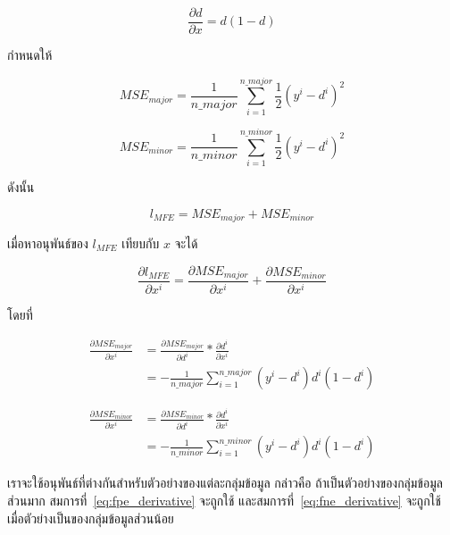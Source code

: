 \begin{equation}
\frac{\partial d}{\partial x} = d(1 - d)
\end{equation}

กำหนดให้

\begin{equation}
MSE_{major} = \frac{1}{n\_major}\sum_{i=1}^{n\_major}\frac{1}{2}(y^{i} - d^{i})^{2}
\end{equation}

\begin{equation}
MSE_{minor} = \frac{1}{n\_minor}\sum_{i=1}^{n\_minor}\frac{1}{2}(y^{i} - d^{i})^{2}
\end{equation}

ดังนั้น

\begin{equation}
    l_{MFE} = MSE_{major} + MSE_{minor}
\end{equation}

เมื่อหาอนุพันธ์ของ $l_{MFE}$ เทียบกับ $x$ จะได้

\begin{equation}
\frac{\partial l_{MFE}}{\partial x^{i}} = \frac{\partial MSE_{major}}{\partial x^{i}} + \frac{\partial MSE_{minor}}{\partial x^{i}}
\end{equation}

โดยที่

\begin{equation} \label{eq:fpe_derivative}
\begin{split}
\frac{\partial MSE_{major}}{\partial x^{i}} & = \frac{\partial MSE_{major}}{\partial d^{i}} * \frac{\partial d^{i}}{\partial x^{i}} \\
& = - \frac{1}{n\_major} \sum_{i=1}^{n\_major} (y^{i} - d^{i}) d^{i} (1 - d^{i})
\end{split}
\end{equation}

\begin{equation} \label{eq:fne_derivative}
\begin{split}
\frac{\partial MSE_{minor}}{\partial x^{i}} & = \frac{\partial MSE_{minor}}{\partial d^{i}} * \frac{\partial d^{i}}{\partial x^{i}} \\
& = - \frac{1}{n\_minor} \sum_{i=1}^{n\_minor} (y^{i} - d^{i}) d^{i} (1 - d^{i})
\end{split}
\end{equation}

เราจะใช้อนุพันธ์ที่ต่างกันสำหรับตัวอย่างของแต่ละกลุ่มข้อมูล กล่าวคือ ถ้าเป็นตัวอย่างของกลุ่มข้อมูลส่วนมาก สมการที่~\ref{eq:fpe_derivative} จะถูกใช้ และสมการที่~\ref{eq:fne_derivative} จะถูกใช้เมื่อตัวย่างเป็นของกลุ่มข้อมูลส่วนน้อย



